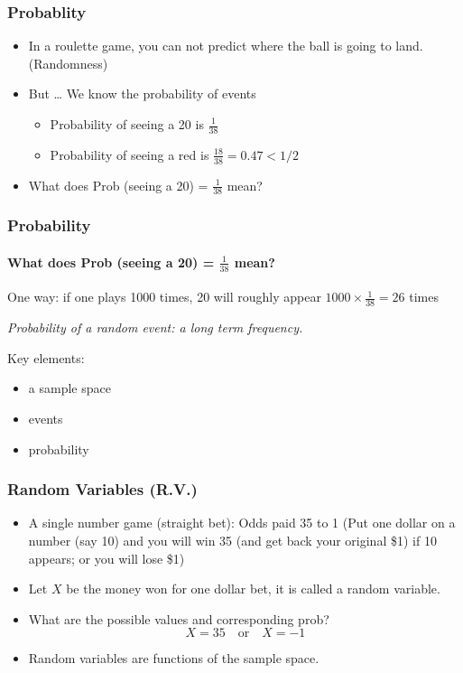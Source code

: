 \documentclass[
  ignorenonframetext,
]{beamer}
\providecommand{\tightlist}{%
  \setlength{\itemsep}{0pt}\setlength{\parskip}{0pt}}
\begin{document}
\begin{frame}
\frametitle{Probablity}

\begin{itemize}
\item
  In a roulette game, you can not predict where the ball is going to
  land. (Randomness)
\item
  But \ldots{} We know the probability of events

  \begin{itemize}
  \tightlist
  \item
    Probability of seeing a 20 is \(\frac{1}{38}\)
  \item
    Probability of seeing a red is \(\frac{18}{38} = 0.47 < 1/2\)
  \end{itemize}
\item
  What does Prob (seeing a 20) = \(\frac{1}{38}\) mean?
\end{itemize}
\end{frame}

\begin{frame}
\frametitle{Probability}
\framesubtitle{What does Prob (seeing a 20) = $\frac{1}{38}$ mean?}

One way: if one plays 1000 times, 20 will roughly appear
\(1000 \times \frac{1}{38} =26\) times

\emph{Probability of a random event: a long term frequency.}

Key elements:

\begin{itemize}
\tightlist
\item
  a sample space
\item
  events
\item
  probability
\end{itemize}
\end{frame}

\begin{frame}
\frametitle{Random Variables (R.V.)}

\begin{itemize}
\item
  A single number game (straight bet): Odds paid 35 to 1 (Put one dollar
  on a number (say 10) and you will win 35 (and get back your original
  \$1) if 10 appears; or you will lose \$1)
\item
  Let \(X\) be the money won for one dollar bet, it is called a random
  variable.
\item
  What are the possible values and corresponding prob?
  \[X=35 \quad \mbox{or} \quad X=-1\]
\item
  Random variables are functions of the sample space.
\end{itemize}
\end{frame}
\end{document}
